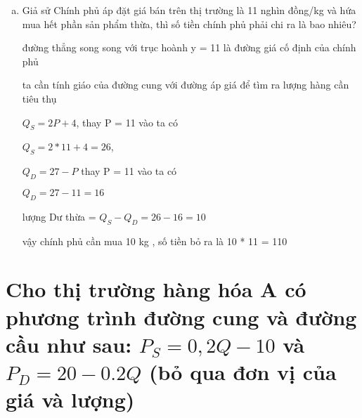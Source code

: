 \documentclass{report}
\begin{document}
\begin{enumerate}[(a)]
    \item Giả sử Chính phủ áp đặt giá bán trên thị trường là 11 nghìn đồng/kg và hứa mua hết phần
          sản phẩm thừa, thì số tiền chính phủ phải chi ra là bao nhiêu?

    đường thẳng song song với trục hoành
    y = 11 là đường giá cố định của chính phủ

    ta cần tính giáo của đường cung với đường áp giá để tìm ra lượng hàng cần tiêu thụ

    $Q_S = 2P + 4$,
    thay P  = 11 vào ta có 

    $Q_S = 2 * 11 + 4 = 26$,

    $Q_D = 27 - P$
    thay P  = 11 vào ta có 

    $Q_D = 27 - 11 = 16$

    lượng Dư thừa = $Q_S - Q_D = 26 - 16 = 10$

    vậy chính phủ cần mua 10 kg
    , số tiền bỏ ra là 10 * 11 = 110 

\end{enumerate}


\section{ Cho thị trường hàng hóa A có phương trình đường cung và đường cầu như 
sau: $P_S = 0,2Q - 10$ và $P_D = 20 - 0.2Q$ (bỏ qua đơn vị của giá và lượng)}
\end{document}
